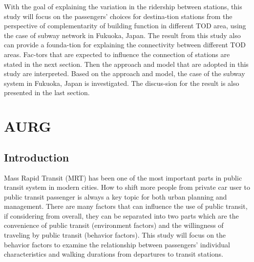 With the goal of explaining the variation in the ridership between stations, this study will focus on the passengers’ choices for destina-tion stations from the perspective of complementarity of building function in different TOD area, using the case of subway network in Fukuoka, Japan. The result from this study also can provide a founda-tion for explaining the connectivity between different TOD areas. Fac-tors that are expected to influence the connection of stations are stated in the next section. Then the approach and model that are adopted in this study are interpreted. Based on the approach and model, the case of the subway system in Fukuoka, Japan is investigated. The discus-sion for the result is also presented in the last section.

\section{AURG}
\subsection{Introduction}
Mass Rapid Transit (MRT) has been one of the most important parts in public transit system in modern cities. How to shift more people from private car user to public transit passenger is always a key topic for both urban planning and management. There are many factors that can influence the use of public transit, if considering from overall, they can be separated into two parts which are the convenience of public transit (environment factors) and the willingness of traveling by public transit (behavior factors). This study will focus on the behavior factors to examine the relationship between passengers' individual characteristics and walking durations from departures to transit stations.

